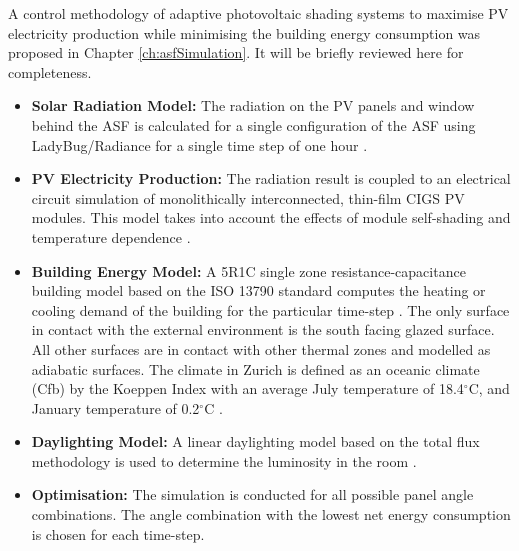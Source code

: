 
A control methodology of adaptive photovoltaic shading systems to maximise PV electricity production while minimising the building energy consumption was proposed in Chapter \ref{ch:asfSimulation}. It will be briefly reviewed here for completeness.

\begin{itemize}
\item \textbf{Solar Radiation Model:} The radiation on the PV panels and window behind the ASF is calculated for a single configuration of the ASF using LadyBug/Radiance for a single time step of one hour \cite{roudsari2013ladybug,ward1994radiance}.
\item \textbf{PV Electricity Production:} The radiation result is coupled to an electrical circuit simulation of monolithically interconnected, thin-film CIGS PV modules. This model takes into account the effects of module self-shading and temperature dependence \cite{hofer2016parametric}.
\item \textbf{Building Energy Model:} A 5R1C single zone resistance-capacitance building model based on the ISO 13790 standard computes the heating or cooling demand of the building for the particular time-step \cite{de2008iso}. The only surface in contact with the external environment is the south facing glazed surface. All other surfaces are in contact with other thermal zones and modelled as adiabatic surfaces. The climate in Zurich is defined as an oceanic climate (Cfb) by the Koeppen Index with an average July temperature of 18.4$^{\circ}$C, and January temperature of 0.2$^{\circ}$C \cite{koppenZurich}.
\item \textbf{Daylighting Model:} A linear daylighting model based on the total flux methodology is used to determine the luminosity in the room \cite{szokolay1980handbook}. 
\item \textbf{Optimisation:} The simulation is conducted for all possible panel angle combinations. The angle combination with the lowest net energy consumption is chosen for each time-step.
\end{itemize}




